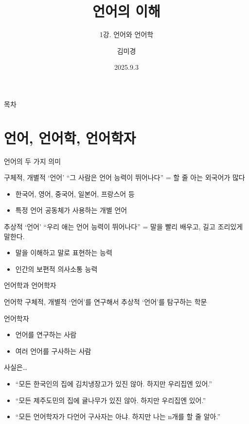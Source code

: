 \documentclass[11pt, aspectratio=169]{beamer}
\title{언어의 이해}
\subtitle{1강. 언어와 언어학}
\author{김미경}
\date{2025.9.3}
\begin{document}
\frame{\titlepage}

\begin{frame}[t]{목차}
\tableofcontents
\end{frame}

\section{언어, 언어학, 언어학자}

\begin{frame}[t]{언어의 두 가지 의미}
  \begin{block}{구체적, 개별적 `언어'}
    “그 사람은 언어 능력이 뛰어나다” = 할 줄 아는 외국어가 많다
    \begin{itemize}
      \item 한국어, 영어, 중국어, 일본어, 프랑스어 등
      \item 특정 언어 공동체가 사용하는 개별 언어
    \end{itemize}    
  \end{block}
  \begin{block}{추상적 `언어'}
    “우리 애는 언어 능력이 뛰어나다” = 말을 빨리 배우고, 길고 조리있게 말한다.
    \begin{itemize}
      \item 말을 이해하고 말로 표현하는 능력
      \item 인간의 보편적 의사소통 능력
    \end{itemize}    
  \end{block}
\end{frame}

\begin{frame}[t]{언어학과 언어학자}
  \begin{block}{언어학}
    구체적, 개별적 `언어'를 연구해서 추상적 `언어'를 탐구하는 학문
  \end{block}

  \begin{block}{언어학자}
    \begin{itemize}
      \item[\checkmark] 언어를 연구하는 사람
      \item[\texttimes] 여러 언어를 구사하는 사람
    \end{itemize}
  \end{block}
  사실은\dots
  \begin{itemize}
    \item “모든 한국인의 집에 김치냉장고가 있진 않아. 하지만 우리집엔 있어.”
    \item “모든 제주도민의 집에 귤나무가 있진 않아. 하지만 우리집엔 있어.”
    \item “모든 언어학자가 다언어 구사자는 아냐. 하지만 나는 n개를 할 줄 알아.”
  \end{itemize}
\end{frame}
\end{document}
